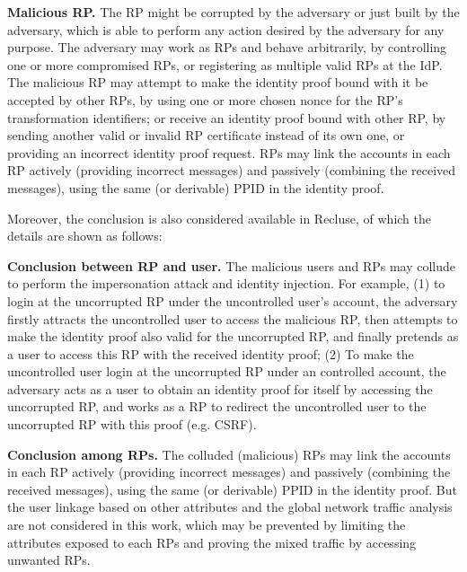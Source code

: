 \textbf{Malicious RP.} The RP might be corrupted by the adversary or just built by the adversary, which is able to perform any action desired by the adversary for any purpose. 
The adversary may work as RPs and behave arbitrarily, by controlling one or more compromised RPs, or registering as multiple valid RPs at the IdP. The malicious RP may attempt to make the identity proof bound with it be  accepted by other RPs, by using one or more chosen nonce for the RP's transformation identifiers; or receive an identity proof bound with other RP, by sending another valid or invalid RP certificate instead of its own one, or providing an incorrect identity proof request. 
RPs may link the accounts in each RP actively (providing incorrect messages) and passively (combining the received messages),  using the same (or derivable) PPID in the identity proof.

Moreover, the conclusion is also considered available in Recluse, of which the details are shown as follows:

\textbf{Conclusion between RP and user.} The malicious users and RPs may collude to perform the impersonation attack and identity injection. For example, (1) to login at the uncorrupted RP under the uncontrolled user's account, the adversary firstly attracts the uncontrolled user to access the malicious RP, then attempts to make the identity proof also valid for the uncorrupted RP, and finally pretends as a user to access this RP with the received identity proof; (2) To make the uncontrolled user login at the uncorrupted RP under an controlled account, the adversary acts as a user to obtain an identity proof for itself by accessing the uncorrupted RP, and works as a RP to redirect the uncontrolled user to the uncorrupted RP with this proof (e.g. CSRF).

\textbf{Conclusion among RPs.} The colluded (malicious) RPs may link the accounts in each RP actively (providing incorrect messages) and passively (combining the received messages),  using the same (or derivable) PPID in the identity proof. But the user linkage based on other attributes and the global network traffic analysis are not considered in this work, which may be prevented by limiting the attributes exposed to each RPs and proving the mixed traffic by accessing unwanted RPs.


